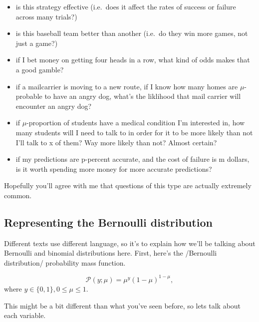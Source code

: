 \documentclass[
]{book}
\providecommand{\tightlist}{%
  \setlength{\itemsep}{0pt}\setlength{\parskip}{0pt}}
\begin{document}
\begin{itemize}
\tightlist
\item
  is this strategy effective (i.e.~does it affect the rates of success or failure across many trials?)
\item
  is this baseball team better than another (i.e.~do they win more games, not just a game?)
\item
  if I bet money on getting four heads in a row, what kind of odds makes that a good gamble?
\item
  if a mailcarrier is moving to a new route, if I know how many homes are \(\mu\)-probable to have an angry dog, what's the liklihood that mail carrier will encounter an angry dog?
\item
  if \(\mu\)-proportion of students have a medical condition I'm interested in, how many students will I need to talk to in order for it to be more likely than not I'll talk to x of them? Way more likely than not? Almost certain?
\item
  if my predictions are p-percent accurate, and the cost of failure is m dollars, is it worth spending more money for more accurate predictions?
\end{itemize}

Hopefully you'll agree with me that questions of this type are actually extremely common.

\hypertarget{representing-the-bernoulli-distribution}{%
\subsection{Representing the Bernoulli distribution}\label{representing-the-bernoulli-distribution}}

Different texts use different language, so it's to explain how we'll be talking about Bernoulli and binomial distributions here. First, here's the /Bernoulli distribution/ probability mass function.

\[\mathcal{P}(y;\mu)=\mu^{y}(1-\mu)^{1-\mu},\]
where \(y\in\{0, 1\}, 0\leq\mu\leq1\).

This might be a bit different than what you've seen before, so lets talk about each variable.
\end{document}
